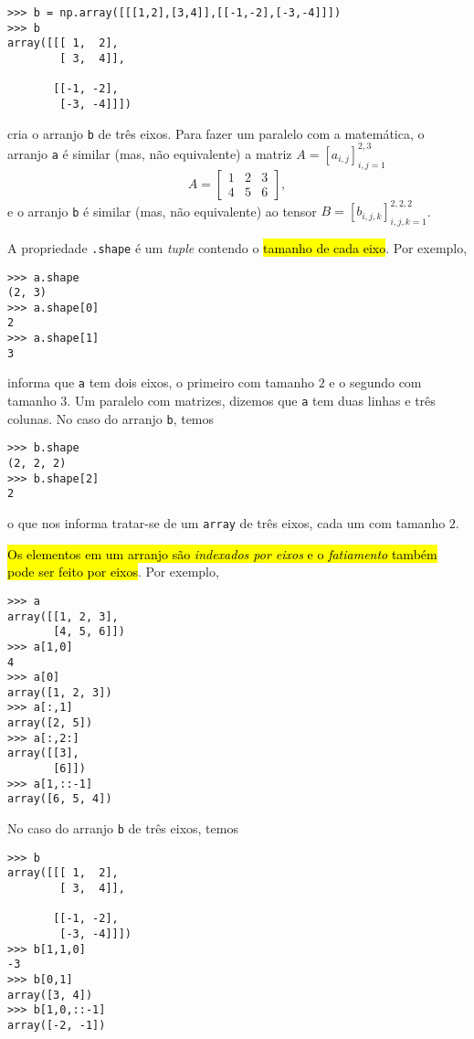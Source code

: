 \begin{lstlisting}
>>> b = np.array([[[1,2],[3,4]],[[-1,-2],[-3,-4]]])
>>> b
array([[[ 1,  2],
        [ 3,  4]],

       [[-1, -2],
        [-3, -4]]])
\end{lstlisting}

cria o arranjo \lstinline+b+ de três eixos. Para fazer um paralelo com a matemática, o arranjo \lstinline+a+ é similar (mas, não equivalente) a matriz $A = [a_{i,j}]_{i,j=1}^{2,3}$
\begin{equation}
  A =
  \begin{bmatrix}
    1 & 2 & 3\\
    4 & 5 & 6
  \end{bmatrix},
\end{equation}
e o arranjo \lstinline+b+ é similar (mas, não equivalente) ao tensor $B = [b_{i,j,k}]_{i,j,k=1}^{2,2,2}$.

A propriedade \lstinline+.shape+ é um \textit{tuple} contendo o \hl{tamanho de cada eixo}. Por exemplo,

\begin{lstlisting}
>>> a.shape
(2, 3)
>>> a.shape[0]
2
>>> a.shape[1]
3
\end{lstlisting}

informa que \lstinline+a+ tem dois eixos, o primeiro com tamanho $2$ e o segundo com tamanho $3$. Um paralelo com matrizes, dizemos que \lstinline+a+ tem duas linhas e três colunas. No caso do arranjo \lstinline+b+, temos

\begin{lstlisting}
>>> b.shape
(2, 2, 2)
>>> b.shape[2]
2
\end{lstlisting}

o que nos informa tratar-se de um \lstinline+array+ de três eixos, cada um com tamanho $2$.

\hl{Os elementos em um arranjo são \emph{indexados por eixos} e o \emph{fatiamento} também pode ser feito por eixos}. Por exemplo,

\begin{lstlisting}
>>> a
array([[1, 2, 3],
       [4, 5, 6]])
>>> a[1,0]
4
>>> a[0]
array([1, 2, 3])
>>> a[:,1]
array([2, 5])
>>> a[:,2:]
array([[3],
       [6]])
>>> a[1,::-1]
array([6, 5, 4])
\end{lstlisting}

No caso do arranjo \lstinline+b+ de três eixos, temos

\begin{lstlisting}
>>> b
array([[[ 1,  2],
        [ 3,  4]],

       [[-1, -2],
        [-3, -4]]])
>>> b[1,1,0]
-3
>>> b[0,1]
array([3, 4])
>>> b[1,0,::-1]
array([-2, -1])
\end{lstlisting}


